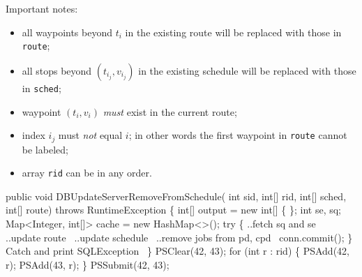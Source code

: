 \documentclass{article}
\def\nwendcode{\endtrivlist \endgroup}
\let\nwdocspar=\par
\theoremstyle{definition}
\begin{document}
Important notes:
\begin{itemize}
\item all waypoints beyond $t_i$ in the existing route will be replaced with
those in {\tt{}route};
\item all stops beyond $(t_{i_j},v_{i_j})$ in the existing schedule will be
replaced with those in {\tt{}sched};
\item waypoint $(t_i,v_i)$ \emph{must} exist in the current route;
\item index $i_j$ must \emph{not} equal $i$; in other words the first waypoint
in {\tt{}route} cannot be labeled;
\item array {\tt{}rid} can be in any order.
\end{itemize}
\nwenddocs{}\endmoddef{}
public void DBUpdateServerRemoveFromSchedule(
    int sid, int[] rid, int[] sched, int[] route)
throws RuntimeException \{
  int[] output = new int[] \{ \};
  int se, sq;
  Map<Integer, int[]> cache = new HashMap<>();
  try \{
    \LA{}..fetch \code{}sq\edoc{} and \code{}se\edoc{}~{\nwtagstyle{}}\RA{}
    \LA{}..update route~{\nwtagstyle{}}\RA{}
    \LA{}..update schedule~{\nwtagstyle{}}\RA{}
    \LA{}..remove jobs from pd, cpd~{\nwtagstyle{}}\RA{}
    conn.commit();
  \}
  \LA{}Catch and print \code{}SQLException\edoc{}~{\nwtagstyle{}}\RA{}
\}
\eatline
{}\nwendcode{}\endmoddef{}
PSClear(42, 43);
for (int r : rid) \{
  PSAdd(42, r);
  PSAdd(43, r);
\}
PSSubmit(42, 43);
\nwendcode{}\nwdocspar
\end{document}
